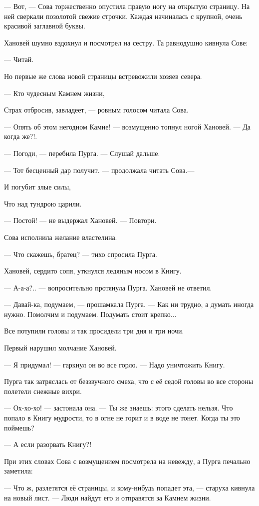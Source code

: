 \documentclass[12pt, a4paper, openany]{book}
\begin{document}
	\qquad  	 — Вот, — Сова торжественно опустила правую ногу на открытую страницу. На ней сверкали позолотой свежие строчки. Каждая начиналась с крупной, очень красивой заглавной буквы.
	
	Хановей шумно вздохнул и посмотрел на сестру. Та равнодушно кивнула Сове:
	
	— Читай.
	
	Но первые же слова новой страницы встревожили хозяев севера.
	
	— Кто чудесным Камнем жизни,
	
	Страх отбросив, завладеет, — ровным голосом читала Сова.
	
	— Опять об этом негодном Камне! — возмущенно топнул ногой Хановей. — Да когда же?!.
	
	— Погоди, — перебила Пурга. — Слушай дальше.
	
	— Тот бесценный дар получит. — продолжала читать Сова.—
	
	И погубит злые силы,
	
	Что над тундрою царили.
	
	— Постой! — не выдержал Хановей. — Повтори.
	
	Сова исполнила желание властелина.
	
	— Что скажешь, братец? — тихо спросила Пурга.
	
	Хановей, сердито сопя, уткнулся ледяным носом в Книгу.
	
	— А-а-а?.. — вопросительно протянула Пурга. Хановей не ответил.
	
	— Давай-ка, подумаем, — прошамкала Пурга. — Как ни трудно, а думать иногда нужно. Помолчим и подумаем. Подумать стоит крепко...
	
	Все потупили головы и так просидели три дня и три ночи.
	
	Первый нарушил молчание Хановей.
	
	— Я придумал! — гаркнул он во все горло. — Надо уничтожить Книгу.
	
	Пурга так затряслась от беззвучного смеха, что с её седой головы во все стороны полетели снежные вихри.
	
	— Ох-хо-хо! — застонала она. — Ты же знаешь: этого сделать нельзя. Что попало в Книгу мудрости, то в огне не горит и в воде не тонет. Когда ты это поймешь?
	
	— А если разорвать Книгу?!
	
	При этих словах Сова с возмущением посмотрела на невежду, а Пурга печально заметила:
	
	— Что ж, разлетятся её страницы, и кому-нибудь попадет эта, — старуха кивнула на новый лист. — Люди найдут его и отправятся за Камнем жизни.
	
\end{document}

